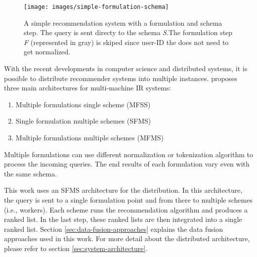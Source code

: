 \begin{figure}[!htb]
    \centering
    \texttt{[image: images/simple-formulation-schema]}
    \caption{A simple recommendation system with a formulation and schema step. The query is sent directy to the schema \emph{S}.The formulation step \emph{F} (represented in gray) is skiped since user-ID the does not need to get normalized.}
    \label{fig:data-fusion-simple}
\end{figure}


With the recent developments in computer science and distributed systems, it is possible to distribute recommender systems into multiple instances. \cite{frankhsuComparingRankScore2005} proposes three main architectures for multi-machine IR systems:

\begin{enumerate}
    \item Multiple formulations single scheme (MFSS)
    \item Single formulation multiple schemes (SFMS)
    \item Multiple formulations multiple schemes (MFMS)
\end{enumerate}


Multiple formulations can use different normalization or tokenization algorithm to process the incoming queries. The end results of each formulation vary even with the same schema.


This work uses an SFMS architecture for the distribution. In this architecture, the query is sent to a single formulation point and from there to multiple schemes (i.e., workers). Each scheme runs the recommendation algorithm and produces a ranked list. In the last step, these ranked lists are then integrated into a single ranked list. Section \ref{sec:data-fusion-approaches} explains the data fusion approaches used in this work. For more detail about the distributed architecture, please refer to section \ref{sec:system-architecture}.

